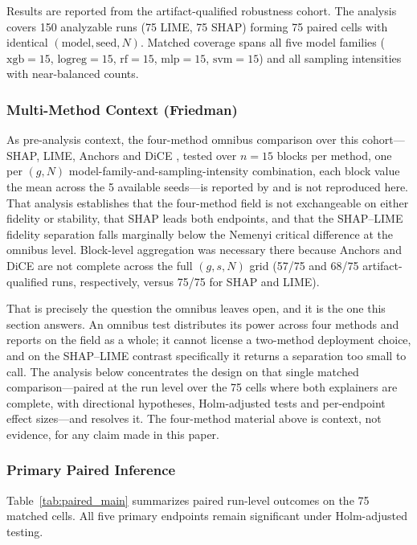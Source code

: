 \documentclass[10pt,a4paper,twoside]{article}
\begin{document}
Results are reported from the artifact-qualified robustness cohort. The
analysis covers 150 analyzable runs (75 LIME, 75 SHAP) forming 75 paired
cells with identical $(\mathrm{model}, \mathrm{seed}, N)$. Matched
coverage spans all five model families ($\mathrm{xgb}=15$,
$\mathrm{logreg}=15$, $\mathrm{rf}=15$, $\mathrm{mlp}=15$,
$\mathrm{svm}=15$) and all sampling intensities with near-balanced counts.

\subsubsection*{Multi-Method Context (Friedman)}

As pre-analysis context, the four-method omnibus comparison over this
cohort---SHAP, LIME, Anchors \citep{ribeiro2018anchors} and DiCE
\citep{mothilal2020dice}, tested over $n=15$ blocks per method, one per
$(g,N)$ model-family-and-sampling-intensity combination, each block value
the mean across the 5 available seeds---is reported by
\citet{herrera2026framework} and is not reproduced here. That analysis
establishes that the four-method field is not exchangeable on either
fidelity or stability, that SHAP leads both endpoints, and that the
SHAP--LIME fidelity separation falls marginally below the Nemenyi critical
difference at the omnibus level. Block-level aggregation was necessary
there because Anchors and DiCE are not complete across the full $(g,s,N)$
grid (57/75 and 68/75 artifact-qualified runs, respectively, versus 75/75
for SHAP and LIME).

That is precisely the question the omnibus leaves open, and it is the one
this section answers. An omnibus test distributes its power across four
methods and reports on the field as a whole; it cannot license a
two-method deployment choice, and on the SHAP--LIME contrast specifically
it returns a separation too small to call. The analysis below concentrates
the design on that single matched comparison---paired at the run level over
the 75 cells where both explainers are complete, with directional
hypotheses, Holm-adjusted tests and per-endpoint effect sizes---and
resolves it. The four-method material above is context, not evidence, for
any claim made in this paper.

\subsubsection*{Primary Paired Inference}

Table~\ref{tab:paired_main} summarizes paired run-level outcomes on the
75 matched cells. All five primary endpoints remain significant under
Holm-adjusted testing.
\end{document}
